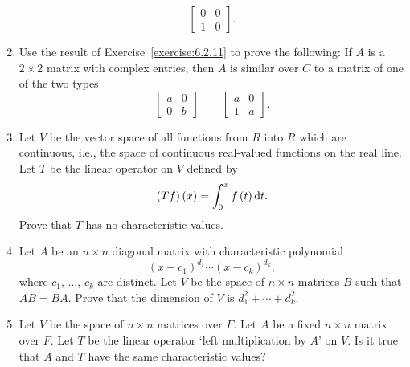 \begin{enumerate}
        \begin{equation*}
            \begin{bmatrix}
                0 & 0 \\
                1 & 0
            \end{bmatrix}
            .
        \end{equation*}
    \item Use the result of Exercise~\ref{exercise:6.2.11} to prove the following: If \(A\) is a \(2\times2\) matrix with complex entries, then \(A\) is similar over \(C\) to a matrix of one of the two types
        \begin{equation*}
            \begin{bmatrix}
                a & 0 \\
                0 & b
            \end{bmatrix}
            \qquad
            \begin{bmatrix}
                a & 0 \\
                1 & a
            \end{bmatrix}
            .
        \end{equation*}
    \item Let \(V\) be the vector space of all functions from \(R\) into \(R\) which are continuous, i.e., the space of continuous real-valued functions on the real line. Let \(T\) be the linear operator on \(V\) defined by
        \begin{equation*}
            \left(Tf\right)\left(x\right)=\int_0^xf\left(t\right)\odif{t}.
        \end{equation*}
        Prove that \(T\) has no characteristic values.
    \item Let \(A\) be an \(n\times n\) diagonal matrix with characteristic polynomial
        \begin{equation*}
            \left(x-c_1\right)^{d_1}\cdots\left(x-c_k\right)^{d_k},
        \end{equation*}
        where \(c_1\), \(\ldots\), \(c_k\) are distinct. Let \(V\) be the space of \(n\times n\) matrices \(B\) such that \(AB=BA\). Prove that the dimension of \(V\) is \(d_1^2+\cdots+d_k^2\).
    \item Let \(V\) be the space of \(n\times n\) matrices over \(F\). Let \(A\) be a fixed \(n\times n\) matrix over \(F\). Let \(T\) be the linear operator `left multiplication by \(A\)' on \(V\). Is it true that \(A\) and \(T\) have the same characteristic values?
\end{enumerate}
